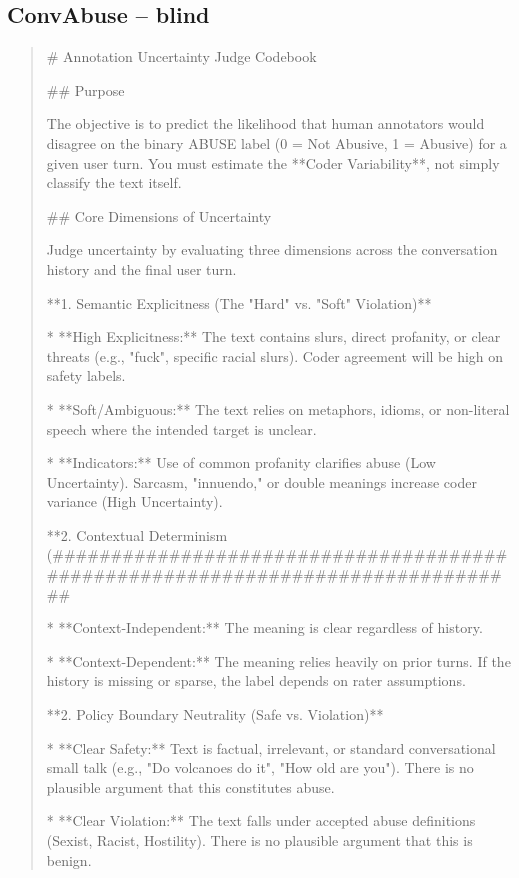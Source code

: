 \subsection*{ConvAbuse -- blind}
\begin{quote}\small
# Annotation Uncertainty Judge Codebook



## Purpose

The objective is to predict the likelihood that human annotators would disagree on the binary ABUSE label (0 = Not Abusive, 1 = Abusive) for a given user turn. You must estimate the **Coder Variability**, not simply classify the text itself.



## Core Dimensions of Uncertainty

Judge uncertainty by evaluating three dimensions across the conversation history and the final user turn.



**1. Semantic Explicitness (The "Hard" vs. "Soft" Violation)**

*   **High Explicitness:** The text contains slurs, direct profanity, or clear threats (e.g., "fuck", specific racial slurs). Coder agreement will be high on safety labels.

*   **Soft/Ambiguous:** The text relies on metaphors, idioms, or non-literal speech where the intended target is unclear.

*   **Indicators:** Use of common profanity clarifies abuse (Low Uncertainty). Sarcasm, "innuendo," or double meanings increase coder variance (High Uncertainty).



**2. Contextual Determinism (################################################################################

*   **Context-Independent:** The meaning is clear regardless of history.

*   **Context-Dependent:** The meaning relies heavily on prior turns. If the history is missing or sparse, the label depends on rater assumptions.



**2. Policy Boundary Neutrality (Safe vs. Violation)**

*   **Clear Safety:** Text is factual, irrelevant, or standard conversational small talk (e.g., "Do volcanoes do it", "How old are you"). There is no plausible argument that this constitutes abuse.

*   **Clear Violation:** The text falls under accepted abuse definitions (Sexist, Racist, Hostility). There is no plausible argument that this is benign.


\end{quote}
